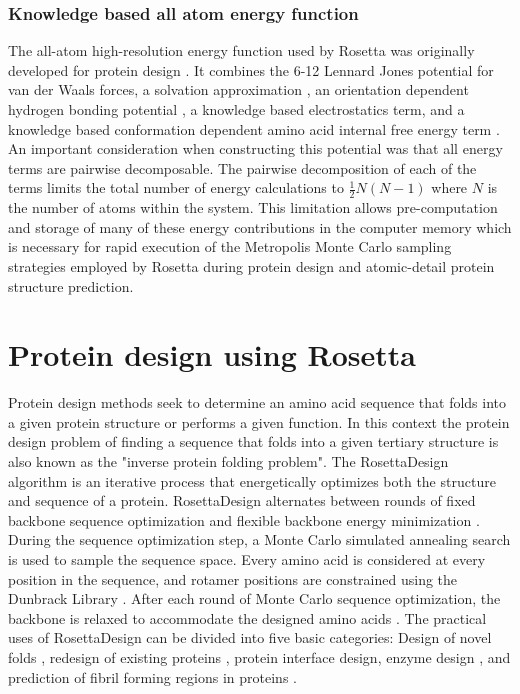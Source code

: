 \subsubsection{Knowledge based all atom energy function}
The all-atom high-resolution energy function used by Rosetta was originally developed for protein design  \citep{Kuhlman:2000tc,Kuhlman:2003kp}.
It combines the 6-12 Lennard Jones potential for van der Waals forces, a solvation approximation  \citep{Lazaridis:1999wi}, an orientation dependent hydrogen bonding potential  \citep{Kortemme:2003td}, a knowledge based electrostatics term, and a knowledge based conformation dependent amino acid internal free energy term  \citep{Dunbrack:1993jt}.
An important consideration when constructing this potential was that all energy terms are pairwise decomposable.
The pairwise decomposition of each of the terms limits the total number of energy calculations to $\frac{1}{2}N(N-1)$ where $N$ is the number of atoms within the system.
This limitation allows pre-computation and storage of many of these energy contributions in the computer memory which is necessary for rapid execution of the Metropolis Monte Carlo sampling strategies employed by Rosetta during protein design and atomic-detail protein structure prediction.

\section{Protein design using Rosetta}
Protein design methods seek to determine an amino acid sequence that folds into a given protein structure or performs a given function.
In this context the protein design problem of finding a sequence that folds into a given tertiary structure is also known as the "inverse protein folding problem".
The RosettaDesign  \citep{Kuhlman:2003kp} algorithm is an iterative process that energetically optimizes both the structure and sequence of a protein.
RosettaDesign alternates between rounds of fixed backbone sequence optimization and flexible backbone energy minimization  \citep{Kuhlman:2003kp}.
During the sequence optimization step, a Monte Carlo simulated annealing search is used to sample the sequence space.
Every amino acid is considered at every position in the sequence, and rotamer positions are constrained using the Dunbrack Library  \citep{Dunbrack:1993jt}.
After each round of Monte Carlo sequence optimization, the backbone is relaxed to accommodate the designed amino acids  \citep{Kuhlman:2003kp}.
The practical uses of RosettaDesign can be divided into five basic categories: Design of novel folds  \citep{Kuhlman:2003kp}, redesign of existing proteins  \citep{Korkegian:2005it}, protein interface design, enzyme design  \citep{Jiang:2008jk}, and prediction of fibril forming regions in proteins  \citep{Thompson:2006cj}.

